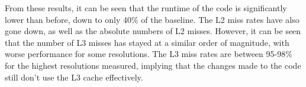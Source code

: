 From these results, it can be seen that the runtime of the code is significantly lower than before, down to only 40\% of the baseline. The L2 miss rates have also gone down, as well as the absolute numbers of L2 misses. However, it can be seen that the number of L3 misses has stayed at a similar order of magnitude, with worse performance for some resolutions. The L3 miss rates are between 95-98\% for the highest resolutions measured, implying that the changes made to the code still don't use the L3 cache effectively.




